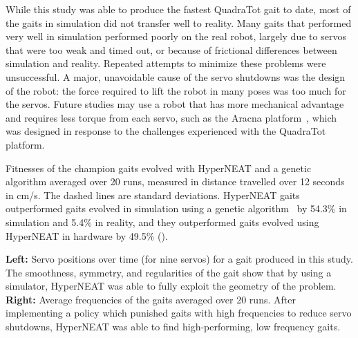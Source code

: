While this study was able to produce the fastest QuadraTot gait to
date, most of the gaits in simulation did not transfer well to
reality. Many gaits that performed very well in simulation performed
poorly on the real robot, largely due to servos that were too weak and
timed out, or because of frictional differences between simulation and
reality. Repeated attempts to minimize these problems were
unsuccessful.  A major, unavoidable cause of the servo shutdowns was
the design of the robot: the force required to lift the robot in many
poses was too much for the servos. Future studies may use a
robot that has more mechanical advantage and requires less torque from
each servo, such as the Aracna platform~\cite{lohmann2012aracna},
which was designed in response to the challenges experienced with the
QuadraTot platform.

{Fitnesses of the champion gaits evolved with HyperNEAT and a genetic algorithm
averaged over 20 runs, measured in distance travelled over 12 seconds
in cm/s. The dashed lines are standard deviations. HyperNEAT gaits outperformed gaits evolved in simulation using a
genetic algorithm~\cite{glette} by 54.3\% in simulation and 5.4\% in
reality, and they outperformed gaits evolved using HyperNEAT in
hardware by 49.5\% ().} 

{\textbf{Left: }
Servo positions over time (for nine servos) for a gait produced in
this study. The smoothness, symmetry, and regularities of the gait
show that by using a simulator, HyperNEAT was able to fully exploit
the geometry of the problem.
\textbf{Right: }Average frequencies of the gaits averaged over 20 runs. 
After implementing a policy which
punished gaits with high frequencies to reduce servo shutdowns,
HyperNEAT was able to find high-performing, low frequency
gaits.}










